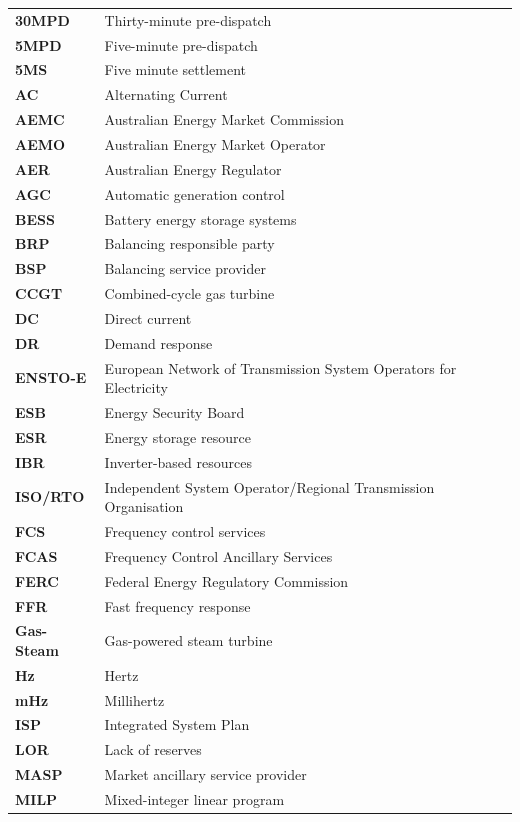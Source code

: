 \documentclass[12pt,a4paper,]{report}
\begin{document}
\begin{longtable}[l]{l l}
\textbf{30MPD} & Thirty-minute pre-dispatch \\
\textbf{5MPD} & Five-minute pre-dispatch \\
\textbf{5MS} & Five minute settlement \\
\textbf{AC} & Alternating Current \\
\textbf{AEMC} & Australian Energy Market Commission \\ 
\textbf{AEMO} & Australian Energy Market Operator \\
\textbf{AER} & Australian Energy Regulator \\
\textbf{AGC} & Automatic generation control \\
\textbf{BESS} & Battery energy storage systems \\
\textbf{BRP} & Balancing responsible party \\
\textbf{BSP} & Balancing service provider \\
\textbf{CCGT} & Combined-cycle gas turbine \\
\textbf{DC} & Direct current \\
\textbf{DR} & Demand response \\
\textbf{ENSTO-E} & European Network of Transmission System Operators for Electricity \\
\textbf{ESB} & Energy Security Board \\
\textbf{ESR} & Energy storage resource \\
\textbf{IBR} & Inverter-based resources \\
\textbf{ISO/RTO} &  Independent System Operator/Regional Transmission Organisation \\
\textbf{FCS} & Frequency control services \\
\textbf{FCAS} & Frequency Control Ancillary Services \\
\textbf{FERC} & Federal Energy Regulatory Commission \\
\textbf{FFR} & Fast frequency response \\
\textbf{Gas-Steam} & Gas-powered steam turbine \\
\textbf{Hz} & Hertz \\
\textbf{mHz} & Millihertz \\
\textbf{ISP} & Integrated System Plan \\
\textbf{LOR} & Lack of reserves \\
\textbf{MASP} & Market ancillary service provider \\
\textbf{MILP} & Mixed-integer linear program \\

\end{longtable}
\end{document}
